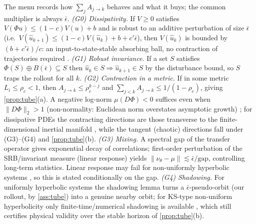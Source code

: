 \documentclass{article}
\theoremstyle{plain}
\theoremstyle{definition}
\theoremstyle{remark}
\newcommand{\state}{u}
\newcommand{\sol}{\Phi}
\begin{document}
The menu records how $\sum_j A_{j\to k}$ behaves and what it buys; the common multiplier is always
$\bar\epsilon$.
\emph{(G0) Dissipativity.} If $V\ge0$ satisfies $V(\sol\state)\le(1-c)V(\state)+b$ and is robust to an
additive perturbation of size $\bar\epsilon$ (i.e.\ $V(\hat\state_{k+1})\le(1-c)V(\hat\state_k)+b+c'\bar\epsilon$),
then $V(\hat\state_k)$ is bounded by $(b+c'\bar\epsilon)/c$: an input-to-state-stable absorbing ball, no
contraction of trajectories required \citep{sontag2008iss}. \emph{(G1) Robust invariance.} If a set $S$
satisfies $\sol(S)\oplus B(\bar\epsilon)\subseteq S$ then $\hat\state_k\in S\Rightarrow\hat\state_{k+1}\in S$
by the disturbance bound, so $S$ traps the rollout for all $k$. \emph{(G2) Contraction in a metric.} If in
some metric $L_i\le\rho_c<1$, then $A_{j\to k}\le\rho_c^{k-j}$ and $\sum_{j<k}A_{j\to k}\le1/(1-\rho_c)$,
giving \cref{prop:tube}(a). A negative log-norm $\mu(D\sol)<0$ suffices even when $\|D\sol\|_2>1$
(non-normality: Euclidean norm overstates asymptotic growth) \citep{lohmiller1998contraction}; for
dissipative PDEs the contracting directions are those transverse to the finite-dimensional inertial
manifold \citep{foias1988inertial,temam1997infinite}, while the tangent (chaotic) directions fall under
(G3)--(G4) and \cref{prop:tube}(b). \emph{(G3) Mixing.} A spectral gap of the transfer operator gives
exponential decay of correlations; first-order perturbation of the SRB/invariant measure (linear response)
yields $\|\nu_\theta-\mu\|\lesssim\bar\epsilon/\mathrm{gap}$, controlling long-term statistics. Linear
response may fail for non-uniformly hyperbolic systems \citep{baladi2014linear}, so this is stated
conditionally on the gap. \emph{(G4) Shadowing.} For uniformly hyperbolic systems the shadowing lemma
\citep{bowen1975equilibrium} turns a $\bar\epsilon$-pseudo-orbit (our rollout, by \cref{ass:tube}) into a
genuine nearby orbit; for KS-type non-uniform hyperbolicity only finite-time/numerical shadowing is
available \citep{wang2014lss,cvitanovic2016chaos}, which still certifies physical validity over the stable
horizon of \cref{prop:tube}(b).
\end{document}
